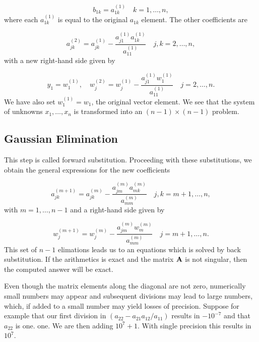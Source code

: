 \documentclass[%
twoside,                 %
final,                   %
10pt]{article}
\begin{document}
{{\begin{equation}
   b_{1k} = a_{1k}^{(1)} \quad k=1,\dots,n,
\end{equation}
where each $a_{1k}^{(1)}$ is equal to the original $a_{1k}$ element. The other coefficients are

\begin{equation}
a_{jk}^{(2)} = a_{jk}^{(1)}-\frac{a_{j1}^{(1)}a_{1k}^{(1)}}{a_{11}^{(1)}} \quad j,k=2,\dots,n,
\end{equation}
with a new right-hand side given by

\begin{equation}
y_{1}=w_1^{(1)}, \quad w_j^{(2)} =w_j^{(1)}-\frac{a_{j1}^{(1)}w_1^{(1)}}{a_{11}^{(1)}} \quad j=2,\dots,n.
\end{equation}
We have also set $w_1^{(1)}=w_1$, the original vector element.
We see that the system of unknowns $x_1,\dots,x_n$ is transformed into an $(n-1)\times (n-1)$ problem.

\subsection{Gaussian Elimination}

This step is called forward substitution.
Proceeding with these substitutions, we obtain the
general expressions for the new coefficients

\begin{equation}
   a_{jk}^{(m+1)} = a_{jk}^{(m)}-\frac{a_{jm}^{(m)}a_{mk}^{(m)}}{a_{mm}^{(m)}} \quad j,k=m+1,\dots,n,
\end{equation}
with $m=1,\dots,n-1$ and a
right-hand side given by

\begin{equation}
   w_j^{(m+1)} =w_j^{(m)}-\frac{a_{jm}^{(m)}w_m^{(m)}}{a_{mm}^{(m)}}\quad j=m+1,\dots,n.
\end{equation}
This set of $n-1$ elimations leads us to an equations which is solved by back substitution.
If the arithmetics is exact and the matrix ${\bf A}$ is not singular, then the computed answer will be exact.

Even though the matrix elements along the diagonal are not zero,
numerically small numbers may appear and subsequent divisions may lead to large numbers, which, if added
to a small number may yield losses of precision. Suppose for example that our first division in $(a_{22}-a_{21}a_{12}/a_{11})$
results in $-10^{-7}$ and that $a_{22}$ is one.
one. We are then
adding $10^7+1$. With single precision this results in $10^7$.

}}
\end{document}
